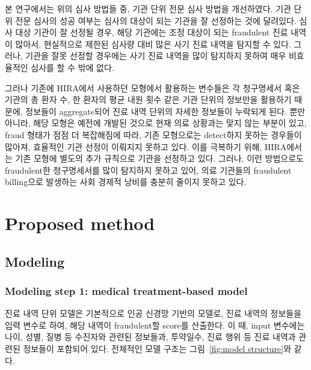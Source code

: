 \documentclass[11pt]{article}           %
\begin{document}
본 연구에서는 위의 심사 방법들 중, 기관 단위 전문 심사 방법을 개선하였다.
기관 단위 전문 심사의 성공 여부는 심사의 대상이 되는 기관을 잘 선정하는 것에 달려있다.
심사 대상 기관이 잘 선정될 경우, 해당 기관에는 조정 대상이 되는 fraudulent 진료 내역이 많아서, 현실적으로 제한된 심사량 대비 많은 사기 진료 내역을 탐지할 수 있다.
그러나, 기관을 잘못 선정할 경우에는 사기 진료 내역을 많이 탐지하지 못하여 매우 비효율적인 심사를 할 수 밖에 없다. 

그러나 기존에 HIRA에서 사용하던 모형에서 활용하는 변수들은 각 청구명세서 혹은 기관의 총 환자 수, 한 환자의 평균 내원 횟수 같은 기관 단위의 정보만을 활용하기 때문에, 정보들이 aggregate되어 진료 내역 단위의 자세한 정보들이 누락되게 된다.
뿐만 아니라, 해당 모형은 예전에 개발된 것으로 현재 의료 상황과는 맞지 않는 부분이 있고, fraud 형태가 점점 더 복잡해짐에 따라, 기존 모형으로는 detect하지 못하는 경우들이 많아져, 효율적인 기관 선정이 이뤄지지 못하고 있다.
이를 극복하기 위해, HIRA에서는 기존 모형에 별도의 추가 규칙으로 기관을 선정하고 있다.
그러나, 이런 방법으로도 fraudulent한 청구명세서를 많이 탐지하지 못하고 있어, 의료 기관들의 fraudulent billing으로 발생하는 사회 경제적 낭비를 충분히 줄이지 못하고 있다. 

\section{Proposed method}
\label{3}
\subsection{Modeling}
\label{3.1}
\subsubsection{Modeling step 1: medical treatment-based model}
\label{3.1.1}

진료 내역 단위 모델은 기본적으로 인공 신경망 기반의 모델로, 진료 내역의 정보들을 입력 변수로 하여, 해당 내역이 fraudulent할 score를 산출한다.
이 때, input 변수에는 나이, 성별, 질병 등 수진자와 관련된 정보들과, 투약일수, 진료 행위 등 진료 내역과 관련된 정보들이 포함되어 있다.
전체적인 모델 구조는 그림~\ref{fig:model structure}와 같다.
\end{document}
